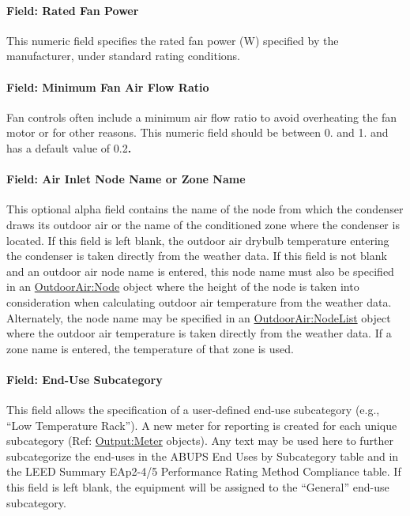 \paragraph{Field: Rated Fan Power}\label{field-rated-fan-power-000}

This numeric field specifies the rated fan power (W) specified by the manufacturer, under standard rating conditions.

\paragraph{Field: Minimum Fan Air Flow Ratio}\label{field-minimum-fan-air-flow-ratio}

Fan controls often include a minimum air flow ratio to avoid overheating the fan motor or for other reasons. This numeric field should be between 0. and 1. and has a default value of 0.2\textbf{.}

\paragraph{Field: Air Inlet Node Name or Zone Name}\label{field-air-inlet-node-name-or-zone-name}

This optional alpha field contains the name of the node from which the condenser draws its outdoor air or the name of the conditioned zone where the condenser is located. If this field is left blank, the outdoor air drybulb temperature entering the condenser is taken directly from the weather data. If this field is not blank and an outdoor air node name is entered, this node name must also be specified in an \hyperref[outdoorairnode]{OutdoorAir:Node} object where the height of the node is taken into consideration when calculating outdoor air temperature from the weather data. Alternately, the node name may be specified in an \hyperref[outdoorairnodelist]{OutdoorAir:NodeList} object where the outdoor air temperature is taken directly from the weather data. If a zone name is entered, the temperature of that zone is used.

\paragraph{Field: End-Use Subcategory}\label{field-end-use-subcategory-4-001}

This field allows the specification of a user-defined end-use subcategory (e.g., ``Low Temperature Rack''). A new meter for reporting is created for each unique subcategory (Ref: \hyperref[outputmeter-and-outputmetermeterfileonly]{Output:Meter} objects). Any text may be used here to further subcategorize the end-uses in the ABUPS End Uses by Subcategory table and in the LEED Summary EAp2-4/5 Performance Rating Method Compliance table. If this field is left blank, the equipment will be assigned to the ``General'' end-use subcategory.

